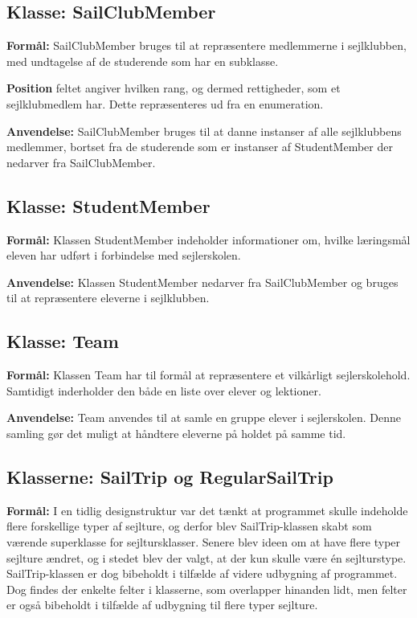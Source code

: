 \subsection*{Klasse: SailClubMember}

\textbf{Formål:}
SailClubMember bruges til at repræsentere medlemmerne i sejlklubben, med undtagelse af de studerende som har en subklasse.

\textbf{Position} feltet angiver hvilken rang, og dermed rettigheder, som et sejlklubmedlem har. 
Dette repræsenteres ud fra en enumeration.

\textbf{Anvendelse:}
SailClubMember bruges til at danne instanser af alle sejlklubbens medlemmer, bortset fra de studerende som er instanser af StudentMember der nedarver fra SailClubMember.

\subsection*{Klasse: StudentMember}
\textbf{Formål:}
Klassen StudentMember indeholder informationer om, hvilke læringsmål eleven har udført i forbindelse med sejlerskolen. 

\textbf{Anvendelse:}
Klassen StudentMember nedarver fra SailClubMember og bruges til at repræsentere eleverne i sejlklubben.

\subsection*{Klasse: Team}

\textbf{Formål:}
Klassen Team har til formål at repræsentere et vilkårligt sejlerskolehold.
Samtidigt inderholder den både en liste over elever og lektioner.

\textbf{Anvendelse:}
Team anvendes til at samle en gruppe elever i sejlerskolen.
Denne samling gør det muligt at håndtere eleverne på holdet på samme tid.

\subsection*{Klasserne: SailTrip og RegularSailTrip}
\textbf{Formål:}
I en tidlig designstruktur var det tænkt at programmet skulle indeholde flere forskellige typer af sejlture, og derfor blev SailTrip-klassen skabt som værende superklasse for sejltursklasser. 
Senere blev ideen om at have flere typer sejlture ændret, og i stedet blev der valgt, at der kun skulle være én sejlturstype. 
SailTrip-klassen er dog bibeholdt i tilfælde af videre udbygning af programmet.
Dog findes der enkelte felter i klasserne, som overlapper hinanden lidt, men felter er også bibeholdt i tilfælde af udbygning til flere typer sejlture.

